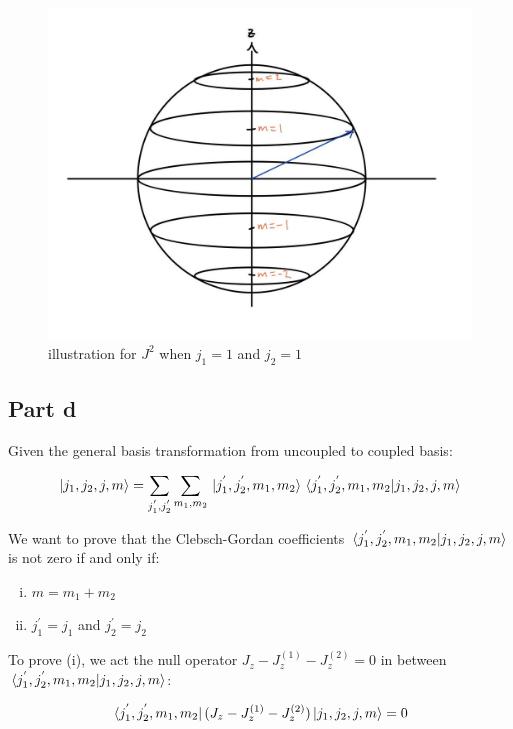 \documentclass{article}
\begin{document}
\begin{figure}[h!]
  \centering
  \includegraphics[width=5in]{../image/AngularMomentumVectorModel.jpg}
  \caption{illustration for $J^2$ when $j_1 = 1$ and $j_2 = 1$}
\end{figure}


\subsection{Part d}

Given the general basis transformation from uncoupled to coupled basis:

\begin{equation}
  \ket{j_1, j_2, j, m} 
  = \sum_{j_1^{'}, j_2^{'}}
  \sum_{m_1, m_2} 
  \ket*{j_1^{'}, j_2^{'}, m_1, m_2}
  \bra*{j_1^{'}, j_2^{'}, m_1, m_2} 
  \ket{j_1, j_2, j, m}
\end{equation}

We want to prove that the Clebsch-Gordan coefficients 
$\bra*{j_1^{'}, j_2^{'}, m_1, m_2} \ket{j_1, j_2, j, m}$ is not zero
if and only if:
\begin{enumerate}[(i)]
  \item $m = m_1 + m_2$
  \item $j_1^{'} = j_1$ and $j_2^{'} = j_2$
\end{enumerate}

To prove (i), we act the null operator $J_z - J_z^{(1)} - J_z^{(2)} = 0$ in between
$\bra*{j_1^{'}, j_2^{'}, m_1, m_2} \ket{j_1, j_2, j, m}$:

\begin{equation}
  \bra*{j_1^{'}, j_2^{'}, m_1, m_2} (J_z - J_z^{(1)} - J_z^{(2)}) \ket{j_1, j_2, j, m} = 0 
\end{equation}
\end{document}
